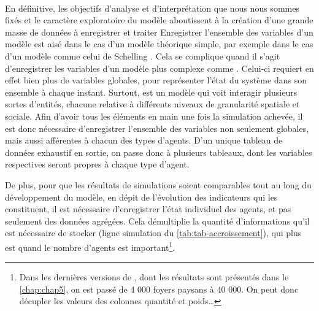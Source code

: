 \medskip
\paragraph[Conclusion intermédiaire]{}
En définitive, les objectifs d'analyse et d'interprétation que nous nous sommes fixés et le caractère exploratoire du modèle \simfeodal{} aboutissent à la création d'une grande masse de données à enregistrer et traiter
Enregistrer l'ensemble des variables d'un modèle est aisé dans le cas d'un modèle théorique simple, par exemple dans le cas d'un modèle comme celui de Schelling \autocite{schelling_dynamic_1971}.
Cela se complique quand il s'agit d'enregistrer les variables d'un modèle plus complexe comme \simfeodal{}.
Celui-ci requiert en effet bien plus de variables globales, pour représenter l'état du système dans son ensemble à chaque instant.
Surtout, \simfeodal{} est un modèle qui voit interagir plusieurs sortes d'entités, chacune relative à différents niveaux de granularité spatiale et sociale.
Afin d'avoir tous les éléments en main une fois la simulation achevée, il est donc nécessaire d'enregistrer l'ensemble des variables non seulement globales, mais aussi afférentes à chacun des types d'agents.
D'un unique tableau de données exhaustif en sortie, on passe donc à plusieurs tableaux, dont les variables respectives seront propres à chaque type d'agent.

De plus, pour que les résultats de simulations soient comparables tout au long du développement du modèle, en dépit de l'évolution des indicateurs qui les constituent, il est nécessaire d'enregistrer l'état individuel des agents, et pas seulement des données agrégées.
Cela démultiplie la quantité d'informations qu'il est nécessaire de stocker (ligne \og simulation\fg{} du \cref{tab:tab-accroissement}), qui plus est quand le nombre d'agents est important\footnote{
	Dans les dernières versions de \simfeodal{}, dont les résultats sont présentés dans le \cref{chap:chap5}, on est passé de 4 000 foyers paysans à 40 000. On peut donc décupler les valeurs des colonnes \og quantité\fg{} et \og poids\fg{}\ldots
}.





